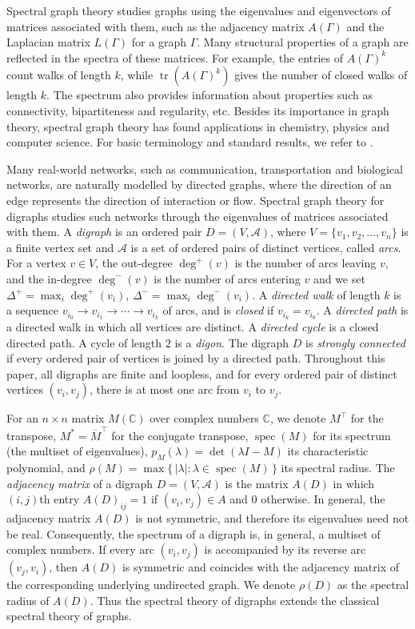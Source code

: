\documentclass[12pt]{article}
\theoremstyle{definition}
\DeclareMathOperator{\spec}{spec}
\begin{document}
Spectral graph theory studies graphs using the eigenvalues and eigenvectors of matrices associated with them, such as the adjacency matrix $A(\Gamma)$ and the Laplacian matrix $L(\Gamma)$ for a graph $\Gamma$. Many structural properties of a graph are reflected in the spectra of these matrices. For example, the entries of $A(\Gamma)^k$ count walks of length $k$, while $\operatorname{tr}(A(\Gamma)^k)$ gives the number of closed walks of length $k$. The spectrum also provides information about properties such as connectivity, bipartiteness and regularity, etc. Besides its importance in graph theory, spectral graph theory has found applications in chemistry, physics and computer science. For basic terminology
and standard results, we refer to \cite{Bapat}.

Many real-world networks, such as communication, transportation and biological networks, are naturally modelled by directed graphs, where the direction of an edge represents the direction of interaction or flow. Spectral graph theory for digraphs studies such networks through the eigenvalues of matrices associated with them. A \emph{digraph} is an ordered pair $D=(V,\mathcal{A})$, where $V = \{v_1,v_2,\dots,v_n\}$ is a finite vertex set and $\mathcal{A}$ is a set of ordered pairs of distinct vertices, called \emph{arcs}. For a vertex $v\in V$, the out-degree $\deg^{+}(v)$ is the number of arcs leaving $v$, and the in-degree $\deg^{-}(v)$ is the number of arcs entering $v$ and we set $\Delta^{+} = \max_i \deg^{+}(v_i)$, $\Delta^{-} = \max_i \deg^{-}(v_i)$. A \emph{directed walk} of length $k$ is a sequence $v_{i_0} \to v_{i_1} \to \cdots \to v_{i_k}$ of arcs, and is \emph{closed} if $v_{i_k} = v_{i_0}$. A \emph{directed path} is a directed walk in which all vertices are distinct. A \emph{directed cycle} is a closed directed path. A cycle of length $2$ is a \emph{digon}. The digraph $D$ is \emph{strongly connected} if every ordered pair of vertices is joined by a directed path. Throughout this paper, all digraphs are finite and loopless, and for every ordered pair of distinct vertices $(v_i,v_j)$, there is at most one arc from $v_i$ to $v_j$. 

For an $n \times n$ matrix $M(\mathbb{C})$ over complex numbers $\mathbb{C}$, we denote $M^{\top}$ for the transpose, $M^{*} = \overline{M}^{\top}$ for the conjugate transpose, $\spec(M)$ for its spectrum (the multiset of eigenvalues), $p_M(\lambda) = \det(\lambda I - M)$ its characteristic polynomial, and $\rho(M) = \max\{\,|\lambda| : \lambda \in \spec(M)\,\}$ its spectral radius. The \emph{adjacency matrix} of a digraph $D=(V,\mathcal{A})$ is the matrix $A(D)$  in which $(i,j)$th entry  $A(D)_{ij} = 1$ if $(v_i,v_j) \in A$ and $0$ otherwise. In general, the adjacency matrix $A(D)$ is not symmetric, and therefore its eigenvalues need not be real. Consequently, the spectrum of a digraph is, in general, a multiset of complex numbers. If every arc $(v_i,v_j)$ is accompanied by its reverse arc $(v_j,v_i)$, then $A(D)$ is symmetric and coincides with the adjacency matrix of the corresponding underlying undirected graph. We denote $\rho(D)$ as the spectral radius of $A(D)$. Thus the spectral theory of digraphs extends the classical spectral theory of graphs.
\end{document}
